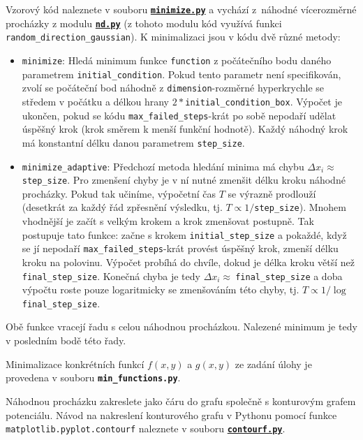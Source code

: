 \documentclass[a4paper,11pt,twoside]{article}
\def\code#1{\textnormal{\texttt{#1}}}
\def\file#1{\textnormal{\textbf{\texttt{#1}}}}
\def\ghfile#1#2{\textnormal{\textbf{\texttt{\href{https://github.com/PavelStransky/PCInPhysics/blob/main/#1#2}{#2}}}}}
\theoremstyle{red}
\theoremstyle{green}
\begin{document}
\begin{solution}
    Vzorový kód naleznete v souboru \ghfile{python/randomwalk/}{minimize.py} a vychází z~náhodné vícerozměrné procházky z modulu \ghfile{python/randomwalk/}{nd.py} (z tohoto modulu kód využívá funkci \code{random_direction_gaussian}).
    K minimalizaci jsou v kódu dvě různé metody:
    \begin{itemize}
        \item \code{minimize}: 
            Hledá minimum funkce \code{function} z počátečního bodu daného parametrem \code{initial_condition}.
            Pokud tento parametr není specifikován, zvolí se počáteční bod náhodně z \code{dimen\-sion}-rozměrné hyperkrychle se středem v počátku a délkou hrany $2*$\code{initial_condition_box}.
            Výpočet je ukončen, pokud se kódu \code{max_failed_steps}-krát po sobě nepodaří udělat úspěšný krok (krok směrem k menší funkční hodnotě).
            Každý náhodný krok má konstantní délku danou parametrem \code{step_size}.  
        \item \code{minimize_adaptive}:
            Předchozí metoda hledání minima má chybu $\Delta x_{i}\approx\ $\code{step_size}.
            Pro zmenšení chyby je v ní nutné zmenšit délku kroku náhodné procházky.
            Pokud tak učiníme, výpočetní čas $T$ se výrazně prodlouží (desetkrát za každý řád zpřesnění výsledku, tj. $T\propto1/$\code{step_size}).
            Mnohem vhodnější je začít s velkým krokem a krok zmenšovat postupně.
            Tak postupuje tato funkce: začne s krokem \code{initial_step_size} a pokaždé, když se jí nepodaří \code{max_failed_steps}-krát provést úspěšný krok, zmenší délku kroku na polovinu.
            Výpočet probíhá do chvíle, dokud je délka kroku větší než \code{final_step_size}.
            Konečná chyba je tedy $\Delta x_{i}\approx\ $\code{final_step_size} a doba výpočtu roste pouze logaritmicky se zmenšováním této chyby, tj. $T\propto1/\log\ $\code{final_step_size}.
    \end{itemize}
    Obě funkce vracejí řadu s celou náhodnou procházkou.
    Nalezené minimum je tedy v posledním bodě této řady.

    Minimalizace konkrétních funkcí $f(x,y)$ a $g(x,y)$ ze zadání úlohy je provedena v souboru \file{min_functions.py}.
\end{solution}

\begin{solved}
    Náhodnou procházku zakreslete jako čáru do grafu společně s konturovým grafem potenciálu.
    Návod na nakreslení konturového grafu v Pythonu pomocí funkce \code{matplotlib.pyplot.contourf} naleznete
    v souboru \ghfile{python/basics/}{contourf.py}.
\end{solved}
\end{document}
